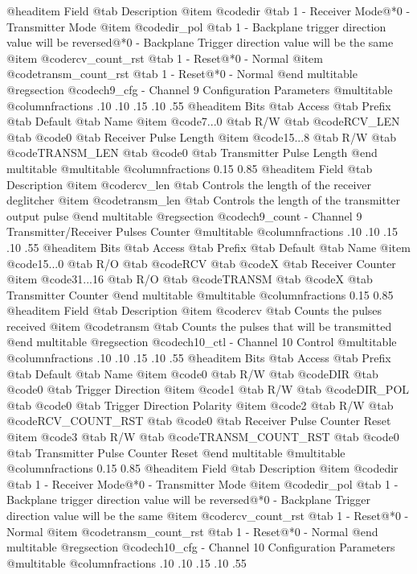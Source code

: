@headitem Field @tab Description
@item @code{dir} @tab 1 - Receiver Mode@*0 - Transmitter Mode
@item @code{dir_pol} @tab 1 - Backplane trigger direction value will be reversed@*0 - Backplane Trigger direction value will be the same
@item @code{rcv_count_rst} @tab 1 - Reset@*0 - Normal
@item @code{transm_count_rst} @tab 1 - Reset@*0 - Normal
@end multitable
@regsection @code{ch9_cfg} - Channel 9 Configuration Parameters
@multitable @columnfractions .10 .10 .15 .10 .55
@headitem Bits @tab Access @tab Prefix @tab Default @tab Name
@item @code{7...0}
@tab R/W @tab
@code{RCV_LEN}
@tab @code{0} @tab 
Receiver Pulse Length
@item @code{15...8}
@tab R/W @tab
@code{TRANSM_LEN}
@tab @code{0} @tab 
Transmitter Pulse Length
@end multitable
@multitable @columnfractions 0.15 0.85
@headitem Field @tab Description
@item @code{rcv_len} @tab Controls the length of the receiver deglitcher
@item @code{transm_len} @tab Controls the length of the transmitter output pulse
@end multitable
@regsection @code{ch9_count} - Channel 9 Transmitter/Receiver Pulses Counter
@multitable @columnfractions .10 .10 .15 .10 .55
@headitem Bits @tab Access @tab Prefix @tab Default @tab Name
@item @code{15...0}
@tab R/O @tab
@code{RCV}
@tab @code{X} @tab 
Receiver Counter
@item @code{31...16}
@tab R/O @tab
@code{TRANSM}
@tab @code{X} @tab 
Transmitter Counter
@end multitable
@multitable @columnfractions 0.15 0.85
@headitem Field @tab Description
@item @code{rcv} @tab Counts the pulses received
@item @code{transm} @tab Counts the pulses that will be transmitted
@end multitable
@regsection @code{ch10_ctl} - Channel 10 Control
@multitable @columnfractions .10 .10 .15 .10 .55
@headitem Bits @tab Access @tab Prefix @tab Default @tab Name
@item @code{0}
@tab R/W @tab
@code{DIR}
@tab @code{0} @tab 
Trigger Direction
@item @code{1}
@tab R/W @tab
@code{DIR_POL}
@tab @code{0} @tab 
Trigger Direction Polarity
@item @code{2}
@tab R/W @tab
@code{RCV_COUNT_RST}
@tab @code{0} @tab 
Receiver Pulse Counter Reset
@item @code{3}
@tab R/W @tab
@code{TRANSM_COUNT_RST}
@tab @code{0} @tab 
Transmitter Pulse Counter Reset
@end multitable
@multitable @columnfractions 0.15 0.85
@headitem Field @tab Description
@item @code{dir} @tab 1 - Receiver Mode@*0 - Transmitter Mode
@item @code{dir_pol} @tab 1 - Backplane trigger direction value will be reversed@*0 - Backplane Trigger direction value will be the same
@item @code{rcv_count_rst} @tab 1 - Reset@*0 - Normal
@item @code{transm_count_rst} @tab 1 - Reset@*0 - Normal
@end multitable
@regsection @code{ch10_cfg} - Channel 10 Configuration Parameters
@multitable @columnfractions .10 .10 .15 .10 .55
